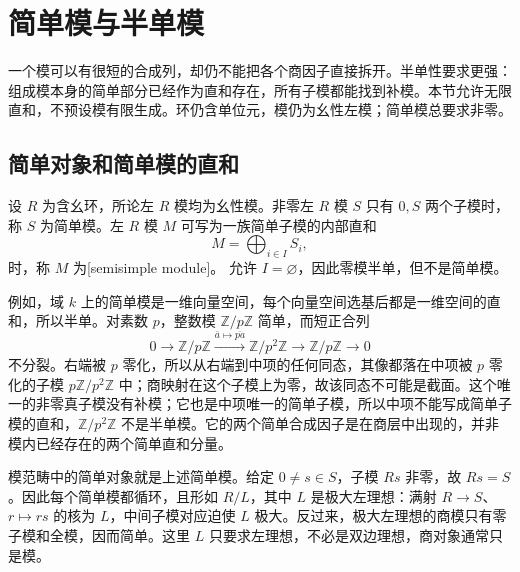 
\section{简单模与半单模}
\label{b2:sec:1301}

一个模可以有很短的合成列，却仍不能把各个商因子直接拆开。半单性要求更强：组成模本身的简单部分已经作为直和存在，所有子模都能找到补模。本节允许无限直和，不预设模有限生成。环仍含单位元，模仍为幺性左模；简单模总要求非零。

%
%

\subsection{简单对象和简单模的直和}
\label{b2:subsec:1301:01}

\begin{definition}\label{b2:def:simple-module}
	设 \(R\) 为含幺环，所论左 \(R\) 模均为幺性模。非零左 \(R\) 模 \(S\) 只有 \(0,S\) 两个子模时，称 \(S\) 为简单模。左 \(R\) 模 \(M\) 可写为一族简单子模的内部直和
	\[
		M=\bigoplus_{i\in I}S_i,
	\]
	时，称 \(M\) 为[semisimple module]。
	\label{b2:def:semisimple-module}
	允许 \(I=\varnothing\)，因此零模半单，但不是简单模。
\end{definition}

例如，域 \(k\) 上的简单模是一维向量空间，每个向量空间选基后都是一维空间的直和，所以半单。对素数 \(p\)，整数模 \(\mathbb Z/p\mathbb Z\) 简单，而短正合列
\[
	0\longrightarrow\mathbb Z/p\mathbb Z\xrightarrow{\bar a\mapsto\overline{pa}} \mathbb Z/p^2\mathbb Z\longrightarrow\mathbb Z/p\mathbb Z\longrightarrow0
\]
不分裂。右端被 \(p\) 零化，所以从右端到中项的任何同态，其像都落在中项被 \(p\) 零化的子模 \(p\mathbb Z/p^2\mathbb Z\) 中；商映射在这个子模上为零，故该同态不可能是截面。这个唯一的非零真子模没有补模；它也是中项唯一的简单子模，所以中项不能写成简单子模的直和，\(\mathbb Z/p^2\mathbb Z\) 不是半单模。它的两个简单合成因子是在商层中出现的，并非模内已经存在的两个简单直和分量。

\ProseParagraphBreak
模范畴中的简单对象就是上述简单模。给定 \(0\ne s\in S\)，子模 \(Rs\) 非零，故 \(Rs=S\)。因此每个简单模都循环，且形如 \(R/L\)，其中 \(L\) 是极大左理想：满射 \(R\to S\)、\(r\mapsto rs\) 的核为 \(L\)，中间子模对应迫使 \(L\) 极大。反过来，极大左理想的商模只有零子模和全模，因而简单。这里 \(L\) 只要求左理想，不必是双边理想，商对象通常只是模。

